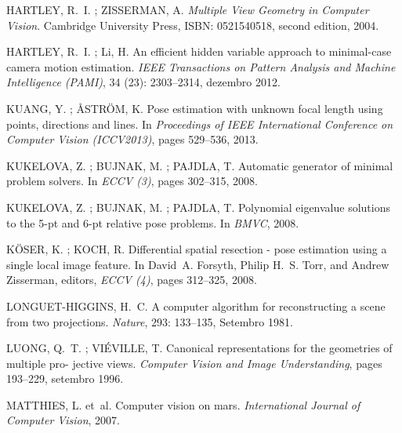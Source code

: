 \documentclass[a4paper,12pt,oneside,onecolumn,final,fleqn]{repUERJ}
\begin{document}
\begin{thebibliography}{33}
HARTLEY, R.~I. ; ZISSERMAN, A.
\newblock \emph{Multiple View Geometry in Computer Vision}.
\newblock Cambridge University Press, ISBN: 0521540518, second edition, 2004.

HARTLEY, R.~I. ; Li, H.
\newblock An efficient hidden variable approach to minimal-case camera motion
  estimation.
\newblock \emph{IEEE Transactions on Pattern Analysis and Machine Intelligence
  (PAMI)}, 34 (23): 2303--2314, dezembro 2012.

KUANG, Y. ; {\AA}STR{\"O}M, K.
\newblock Pose estimation with unknown focal length using points, directions
  and lines.
\newblock In \emph{Proceedings of IEEE International Conference on Computer
  Vision (ICCV2013)}, pages 529--536, 2013.

KUKELOVA, Z. ; BUJNAK, M. ; PAJDLA, T.
\newblock Automatic generator of minimal problem solvers.
\newblock In \emph{ECCV (3)}, pages 302--315, 2008{}.

KUKELOVA, Z. ; BUJNAK, M. ; PAJDLA, T.
\newblock Polynomial eigenvalue solutions to the 5-pt and 6-pt relative pose
  problems.
\newblock In \emph{BMVC}, 2008{}.

K\"OSER, K. ; KOCH, R.
\newblock Differential spatial resection - pose estimation using a single local
  image feature.
\newblock In David~A. Forsyth, Philip H.~S. Torr, and Andrew Zisserman,
  editors, \emph{ECCV (4)}, pages 312--325, 2008.

LONGUET-HIGGINS, H.~C.
\newblock A computer algorithm for reconstructing a scene from two projections.
\newblock \emph{Nature}, 293: 133--135, Setembro 1981.

LUONG, Q.~T. ; VIÉVILLE, T.
\newblock Canonical representations for the geometries of multiple pro- jective
  views.
\newblock \emph{Computer Vision and Image Understanding}, pages 193--229,
  setembro 1996.

MATTHIES, L. et~al. 
\newblock Computer vision on mars.
\newblock \emph{International Journal of Computer Vision}, 2007.


\end{thebibliography}
\end{document}
